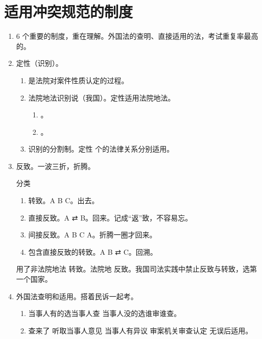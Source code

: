 \section{适用冲突规范的制度}
\begin{enumerate}
  \item 6 个重要的制度，重在理解。外国法的查明、直接适用的法，考试重复率最高的。
  \item 定性（识别）。
        \begin{enumerate}
          \item 是法院对案件性质认定的过程。
          \item 法院地法识别说（我国）。定性适用法院地法。
                \begin{enumerate}
                  \item {}。
                  \item {}。
                \end{enumerate}
          \item 识别的分割制。定性  个的法律关系分别适用。
        \end{enumerate}
  \item 反致。一波三折，折腾。
        \begin{kk}{分类}
          \begin{enumerate}
            \item 转致。A \yjt B \yjt C。出去。
            \item 直接反致。A ⇄ B。回来。记成“返”致，不容易忘。%
            \item 间接反致。A \yjt B \yjt C \yjt A。折腾一圈才回来。
            \item 包含直接反致的转致。A \yjt B ⇄ C。回溯。%
          \end{enumerate}
          \tcblower
          用了非法院地法 \yjt 转致。法院地 \yjt 反致。我国司法实践中禁止反致与转致，选第一个国家。
        \end{kk}
  \item 外国法查明和适用。搭着民诉一起考。
        \begin{enumerate}
          \item 当事人有的选当事人查 \yjt 当事人没的选谁审谁查。
          \item 查来了 \yjt 听取当事人意见 \yjt 当事人有异议 \yjt 审案机关审查认定 \yjt 无误后适用。

\end{enumerate}
\end{enumerate}
